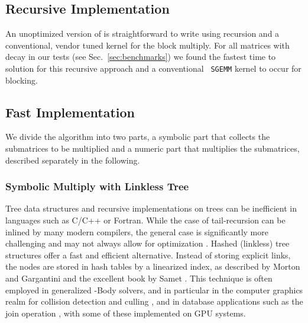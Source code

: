 \subsection{Recursive Implementation}
\label{sec:recursive_implementation}

An unoptimized version of \SpAMM{} is straightforward to write using recursion
and a conventional, vendor tuned kernel for the block multiply. For all
matrices with decay in our tests (see Sec.~\ref{sec:benchmarks}) we found the
fastest time to solution for this recursive approach and a conventional {\tt
SGEMM} kernel to occur for  blocking.

\subsection{Fast Implementation}
\label{sec:fast_implementation}

We divide the \SpAMM{} algorithm into two parts, a symbolic part that
collects the submatrices to be multiplied and a numeric part that multiplies
the submatrices, described separately in the following.

\subsubsection{Symbolic Multiply with Linkless Tree}
\label{sec:linkless_tree}

Tree data structures and recursive implementations on trees can be inefficient
in languages such as C/C++ or Fortran. While the case of tail-recursion can be
inlined by many modern compilers, the general case is significantly more
challenging and may not always allow for optimization
\cite{Stitt:2008:RF:1366110.1366143, Tang:2006:CIR:1185448.1185574}. Hashed
(linkless) tree structures offer a fast and efficient alternative. Instead of
storing explicit links, the nodes are stored in hash tables by a linearized
index, as described by Morton \cite{Morton66} and Gargantini
\cite{Gargantini1982} and the excellent book by Samet
\cite{Samet:1990:DAS:77589}. This technique is often employed in generalized
-Body solvers, and in particular in the computer graphics realm for
collision detection and culling \cite{CGF:CGF1554, CGF:CGF1775,
Lefebvre:2006:PSH:1141911.1141926, Lefebvre:2006:PSH:1179352.1141926,
AVRIL:2009:HAL-00412870:1, Zou2008, 694268}, and in database applications such
as the join operation \cite{Amossen:2009:SpMMeqJoin,
Lieberman:2008:FSJ:1546682.1547260, Jacox:2003:ISJ:937598.937600, 4115860},
with some of these implemented on GPU systems.

